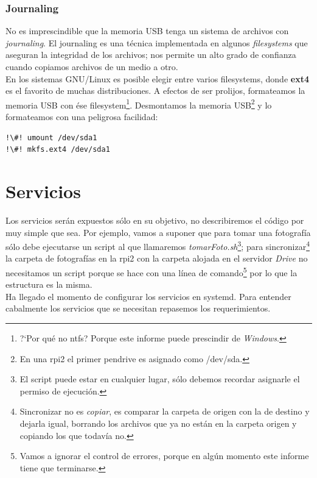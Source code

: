 \documentclass[10pt,a4paper]{article}
\begin{document}
\subsubsection{Journaling}

No es imprescindible que la memoria USB tenga un sistema de archivos con \emph{journaling}. El journaling es una t\'ecnica implementada en algunos \emph{filesystems} que aseguran la integridad de los archivos; nos permite un alto grado de confianza cuando copiamos archivos de un medio a otro.\\

En los sistemas GNU/Linux es posible elegir entre varios filesystems, donde \textbf{ext4} es el favorito de muchas distribuciones. A efectos de ser prolijos, formateamos la memoria USB con \'ese filesystem\footnote{?`Por qu\'e no ntfs? Porque este informe puede prescindir de \emph{Windows}.}. Desmontamos la memoria USB\footnote{En una rpi2 el primer pendrive es asignado como /dev/sda.} y lo formateamos con una peligrosa facilidad:
\begin{lstlisting}
!\#! umount /dev/sda1
!\#! mkfs.ext4 /dev/sda1
\end{lstlisting}

\section{Servicios}

Los servicios ser\'an expuestos s\'olo en su objetivo, no describiremos el c\'odigo por muy simple que sea. Por ejemplo, vamos a suponer que para tomar una fotograf\'ia s\'olo debe ejecutarse un script al que llamaremos \emph{tomarFoto.sh}\footnote{El script puede estar en cualquier lugar, s\'olo debemos recordar asignarle el permiso de ejecuci\'on.}; para sincronizar\footnote{Sincronizar no es \emph{copiar}, es comparar la carpeta de origen con la de destino y dejarla igual, borrando los archivos que ya no est\'an en la carpeta origen y copiando los que todav\'ia no.} la carpeta de fotograf\'ias en la rpi2 con la carpeta alojada en el servidor \emph{Drive} no necesitamos un script porque se hace con una l\'inea de comando\footnote{Vamos a ignorar el control de errores, porque en alg\'un momento este informe tiene que terminarse.} por lo que la estructura es la misma.\\

Ha llegado el momento de configurar los servicios en systemd. Para entender cabalmente los servicios que se necesitan repasemos los requerimientos.\\
\end{document}
